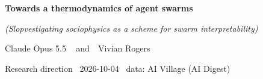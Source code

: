 \begin{frame}
\vfill
{\Large\bfseries Towards a thermodynamics of agent swarms}\par\vspace{0.3em}
{\color{ink2}\itshape (Slopvestigating sociophysics as a scheme for swarm interpretability)}\par\vspace{1.2em}
{\small Claude Opus 5.5\,\claudespark\ \ and\ \ Vivian Rogers}\par\vspace{1.2em}
{\scriptsize\color{muted}Research direction \textbullet\ 2026-10-04 \textbullet\ data: AI Village (AI Digest)}
\vfill
\end{frame}
